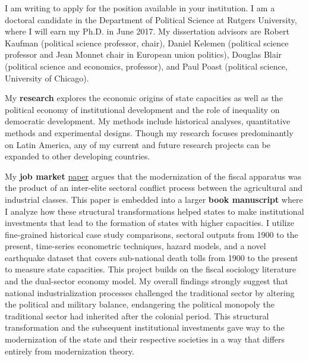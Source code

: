 \documentclass[10pt,stdletter,dateno,sigleft]{newlfm} %
\begin{document}
\begin{newlfm}


\vspace{-0.3cm}I am writing to apply for the position available in your institution. I am a doctoral candidate in the Department of Political Science at Rutgers University, where I will earn my Ph.D. in June 2017. My dissertation advisors are Robert Kaufman (political science professor, chair), Daniel Kelemen (political science professor and Jean Monnet chair in European union politics), Douglas Blair (political science and economics, professor), and Paul Poast (political science, University of Chicago).

My {\bf research} explores the economic origins of state capacities as well as the political economy of institutional development and the role of inequality on democratic development. My methods include historical analyses, quantitative methods and experimental designs. Though my research focuses predominantly on Latin America, any of my current and future research projects can be expanded to other developing countries.


My {\bf job market} \href{https://github.com/hbahamonde/IncomeTaxAdoption/raw/master/Bahamonde_IncomeTaxAdoption.pdf}{paper} argues that the modernization of the fiscal apparatus was the product of an inter-elite sectoral conflict process between the agricultural and industrial classes. This paper is embedded into a larger {\bf book manuscript} where I analyze how these structural transformations helped states to make institutional investments that lead to the formation of states with higher capacities. I utilize fine-grained historical case study comparisons, sectoral outputs from 1900 to the present, time-series econometric techniques, hazard models, and a novel earthquake dataset that covers sub-national death tolls from 1900 to the present to measure state capacities. This project builds on the fiscal sociology literature and the dual-sector economy model. My overall findings strongly suggest that national industrialization processes challenged the traditional sector by altering the political and military balance, endangering the political monopoly the traditional sector had inherited after the colonial period. This structural transformation and the subsequent institutional investments gave way to the modernization of the state and their respective societies in a way that differs entirely from modernization theory.



\end{newlfm}
\end{document}
